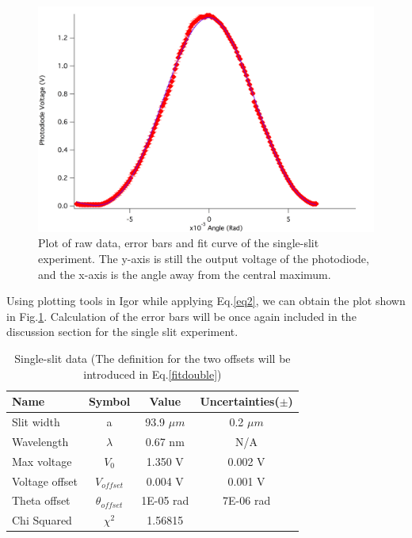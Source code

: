 \documentclass[prb,preprint]{revtex4-1}
\begin{document}
\begin{figure}[h]
\centering
\includegraphics[width=6.6in]{single.png}
\caption{Plot of raw data, error bars and fit curve of the single-slit experiment. The y-axis is still the output voltage of the photodiode, and the x-axis is the angle away from the central maximum.}
\label{single}
\end{figure}

Using plotting tools in Igor while applying Eq.\ref{eq2}, we can obtain the plot shown in Fig.\ref{single}. Calculation of the error bars will be once again included in the discussion section for the single slit experiment.

\begin{table}[h]
\centering
\caption{Single-slit data (The definition for the two offsets will be introduced in Eq.\ref{fitdouble})}
\begin{ruledtabular}
\begin{tabular}{ l c c c}
Name & Symbol & Value & Uncertainties($\pm$)\\
\hline
Slit width & a & 93.9 $\mu m$ & 0.2 $\mu m$\\
Wavelength & $\lambda$ & 0.67 nm & N/A \\
Max voltage & $V_0$ & 1.350 V & 0.002 V\\
Voltage offset & $V_{offset}$ &  0.004 V & 0.001 V\\
Theta offset &$ \theta_{offset}$ & 1E-05 rad & 7E-06 rad \\

\hline
Chi Squared & $\chi^2$ & 1.56815 &
\end{tabular}
\end{ruledtabular}
\label{data}
\end{table}
\end{document}
